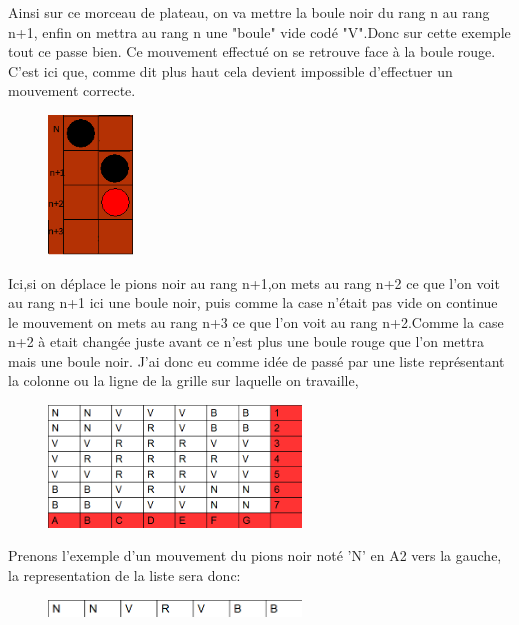 \documentclass{article}
\begin{document}
Ainsi sur ce morceau de plateau, on va mettre la boule noir du rang n au rang n+1, enfin on mettra au rang n une "boule" vide codé "V".Donc sur cette exemple tout ce passe bien. Ce mouvement effectué on se retrouve face à la boule rouge. C'est ici que, comme dit plus haut cela devient impossible d'effectuer un mouvement correcte.

\begin{figure}[!h]
\centerline{\includegraphics[width=0.2\textwidth]{images/fonctionalite_mouvement2.png}}
\vspace{1cm}
\caption{}
\end{figure}
Ici,si on déplace le pions noir au rang n+1,on mets au rang n+2 ce que l'on voit au rang n+1 ici une boule noir, puis comme la case n'était pas vide on continue le mouvement on mets au rang n+3 ce que l'on voit au rang n+2.Comme la case n+2 à etait changée juste avant ce n'est plus une boule rouge que l'on mettra mais une boule noir.
\newpage
J'ai donc eu comme idée de passé par une liste représentant la colonne ou la ligne de la grille sur laquelle on travaille,


\begin{figure}[!h]
\centerline{\includegraphics[width=0.6\textwidth]{images/schemas_plateau.png}}
\vspace{1cm}
\caption{}
\end{figure}

Prenons l'exemple d'un mouvement du pions noir noté 'N' en A2 vers la gauche, la representation de la liste sera donc:
\begin{figure}[!h]
\centerline{\includegraphics[width=0.6\textwidth]{images/ligne.png}}
\vspace{1cm}
\caption{}
\end{figure}
\end{document}
